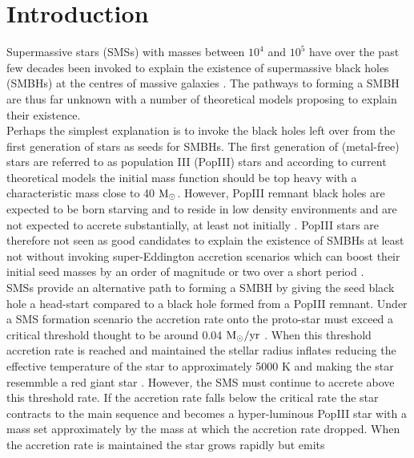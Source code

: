 \documentclass[graphics, twocolumn, usenatbib]{mn2e}
\newcommand{\msolarc} {$\rm{M_{\odot}}$}
\newcommand{\msolaryr} {$\rm{M_{\odot}/yr}~$}
\begin{document}
\section{Introduction} \label{Sec:Introduction}
Supermassive stars (SMSs) with masses between $10^4$ and $10^5$ have over the past few decades been invoked \citep{Rees_1978, Begelman_1978, Begelman_2006,
  Begelman_2008, Latif_2016a, Woods_2018} to explain the existence of supermassive black holes (SMBHs) at the centres of massive galaxies \citep{Fan_06, Kormendy_2013}.
The pathways to forming a SMBH are thus far unknown with a number of theoretical models proposing to explain their existence. \\
\indent Perhaps the
simplest explanation is to invoke the black holes left over from the first 
generation of stars as seeds for SMBHs. The first generation of (metal-free) 
stars are referred to as population III (PopIII) stars and according to 
current theoretical models \citep[e.g.][]{Turk_2009, Clark_2008, Hirano_2014, Stacy_2016} the initial mass function should be top heavy with a characteristic mass close to 40 \msolarc. However, PopIII remnant black holes are expected to be born starving \citep{Whalen_2004, Milosavljevic_2009} and to reside in low
density environments and are not expected to accrete substantially, at least not 
initially \citep{Alvarez_2009, Smith_2018}. PopIII stars are therefore not seen as good candidates to explain the existence of SMBHs at least not without invoking super-Eddington accretion scenarios which can boost their initial 
seed masses by an order of magnitude or two over a short period \citep{Lupi_2014, Pacucci_2015a, Sakurai_2016a,Inayoshi_2016, Pacucci_2017, Inayoshi_2018}.\\
\indent SMSs provide an alternative path to forming a SMBH by giving the seed black hole a head-start compared to a black hole formed from a PopIII remnant. Under a SMS formation scenario the accretion rate onto the proto-star must exceed a critical threshold thought to be around 0.04 \msolaryr \cite{Sakurai_2016}. When
this threshold accretion rate is reached and maintained the stellar radius inflates reducing the effective temperature of the star to approximately 5000 K
and making the star resemmble a red giant star \citep{Omukai_2003, Hosokawa_2012, Hosokawa_2013, Woods_2017}. However, the SMS must continue to
accrete above this threshold rate. If the accretion rate falls below the critical
rate the star contracts to the main sequence and becomes a hyper-luminous PopIII
star with a mass set approximately by the mass at which the accretion rate dropped. When the accretion rate is maintained the star grows rapidly but emits
\end{document}
